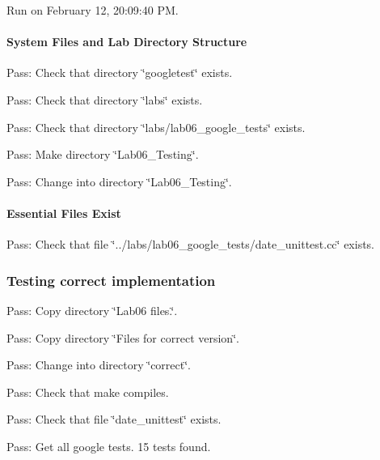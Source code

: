 Run on February 12, 20\+:09\+:40 PM.

\paragraph*{System Files and Lab Directory Structure}


\begin{DoxyItemize}
\item Pass\+: Check that directory \char`\"{}googletest\char`\"{} exists.
\item Pass\+: Check that directory \char`\"{}labs\char`\"{} exists.
\item Pass\+: Check that directory \char`\"{}labs/lab06\+\_\+google\+\_\+tests\char`\"{} exists.
\item Pass\+: Make directory \char`\"{}\+Lab06\+\_\+\+Testing\char`\"{}.
\item Pass\+: Change into directory \char`\"{}\+Lab06\+\_\+\+Testing\char`\"{}.
\end{DoxyItemize}

\paragraph*{Essential Files Exist}


\begin{DoxyItemize}
\item Pass\+: Check that file \char`\"{}../labs/lab06\+\_\+google\+\_\+tests/date\+\_\+unittest.\+cc\char`\"{} exists.
\end{DoxyItemize}

\subsubsection*{Testing correct implementation}


\begin{DoxyItemize}
\item Pass\+: Copy directory \char`\"{}\+Lab06 files.\char`\"{}.
\item Pass\+: Copy directory \char`\"{}\+Files for correct version\char`\"{}.
\item Pass\+: Change into directory \char`\"{}correct\char`\"{}.
\item Pass\+: Check that make compiles.
\item Pass\+: Check that file \char`\"{}date\+\_\+unittest\char`\"{} exists.
\item Pass\+: Get all google tests. 15 tests found.
\end{DoxyItemize}

